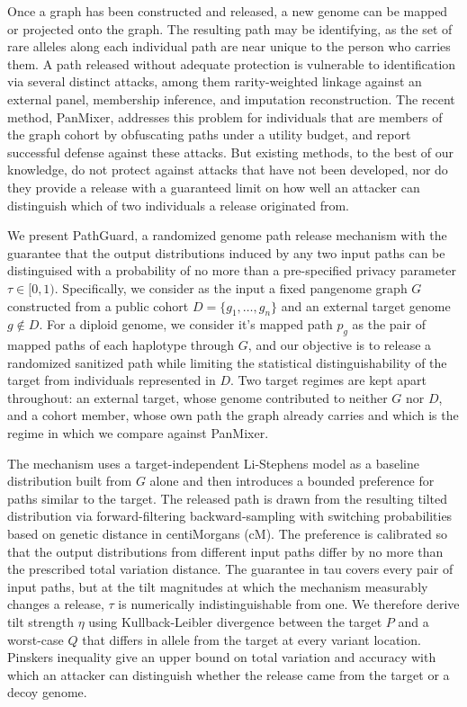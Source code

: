 Once a graph has been constructed and released, a new genome can be mapped or projected onto the graph. The resulting path may be identifying, as the set of rare alleles along each individual path are near unique to the person who carries them. A path released without adequate protection is vulnerable to identification via several distinct attacks, among them rarity-weighted linkage against an external panel, membership inference, and imputation reconstruction. The recent method, PanMixer, addresses this problem for individuals that are members of the graph cohort by obfuscating paths under a utility budget, and report successful defense against these attacks. But existing methods, to the best of our knowledge, do not protect against attacks that have not been developed, nor do they provide a release with a guaranteed limit on how well an attacker can distinguish which of two individuals a release originated from.

We present PathGuard, a randomized genome path release mechanism with the guarantee that the output distributions induced by any two input paths can be distinguised with a probability of no more than a pre-specified privacy parameter$\tau\in[0,1)$. Specifically, we consider as the input a fixed pangenome graph $G$ constructed from a public cohort $D=\{g_1,\ldots,g_n\}$ and an external target genome $g\notin D$. For a diploid genome, we consider it's mapped path $p_g$ as the pair of mapped paths of each haplotype through $G$, and our objective is to release a randomized sanitized path while limiting the statistical distinguishability of the target from individuals represented in $D$. Two target regimes are kept apart throughout: an external target, whose genome contributed to neither $G$ nor $D$, and a cohort member, whose own path the graph already carries and which is the regime in which we compare against PanMixer.

The mechanism uses a target-independent Li-Stephens model as a baseline distribution built from $G$ alone and then introduces a bounded preference for paths similar to the target. The released path is drawn from the resulting tilted distribution via forward-filtering backward-sampling with switching probabilities based on genetic distance in centiMorgans (cM). The preference is calibrated so that the output distributions from different input paths differ by no more than the prescribed total variation distance. The guarantee in tau covers every pair of input paths, but at the tilt magnitudes at which the mechanism measurably changes a release, $\tau$ is numerically indistinguishable from one. We therefore derive tilt strength $\eta$ using Kullback-Leibler divergence between the target $P$ and a worst-case $Q$ that differs in allele from the target at every variant location. Pinskers inequality give an upper bound on total variation and accuracy with which an attacker can distinguish whether the release came from the target or a decoy genome.

